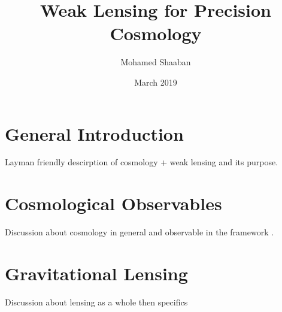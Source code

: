 \documentclass{article}
\title{Weak Lensing for Precision Cosmology}
\author{Mohamed Shaaban}
\date{March 2019}
\begin{document}
\maketitle



\section{General Introduction}
Layman friendly descirption of cosmology + weak lensing and its purpose.

\section{Cosmological Observables}
Discussion about cosmology in general and observable in the framework \cite{general_2013}.

\section{Gravitational Lensing}
Discussion about lensing as a whole then specifics \cite{rachel_2018} \cite{massey_2013} \cite{Subaru_2019} 



\end{document}
